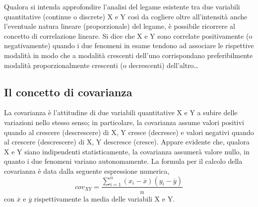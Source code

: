 Qualora si intenda approfondire l'analisi del legame esistente tra due 
variabili quantitative (continue o discrete) X e Y così da cogliere oltre 
all'intensità anche l'eventuale natura lineare (proporzionale) del legame, 
è possibile ricorrere al concetto di correlazione lineare. Si dice che X e 
Y sono correlate positivamente (o negativamente) quando i due fenomeni in 
esame tendono ad associare le rispettive modalità in modo che a modalità 
crescenti dell'uno corrispondano preferibilmente modalità proporzionalmente 
crescenti (o decrescenti) dell'altro\dots 

\subsection{Il concetto di covarianza}

La covarianza è l'attitudine di due variabili quantitative X e Y a subire 
delle variazioni nello stesso senso; in particolare, la covarianza assume 
valori positivi quando al crescere (descrescere) di X, Y cresce (decresce) 
e valori negativi quando al crescere (descrescere) di X, Y descresce 
(cresce). Appare evidente che, qualora X e Y siano indipendenti 
statisticamente, la covarianza assumerà valore nullo, in quanto i due 
fenomeni variano autonomamente. 
La formula per il calcolo della covarianza è data dalla seguente  
espressione numerica,
\[cov_{XY}=\frac{\sum_{i=1}^{n}(x_i-\overline{x})(y_i-\overline{y})}{n}\]
con \(\overline{x}\) e \(\overline{y}\) rispettivamente la media delle 
variabili X e Y.

